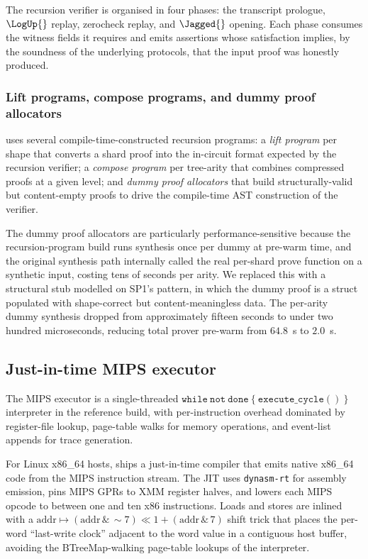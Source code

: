 The recursion verifier is organised in four phases: the transcript prologue, $\LogUp{}$ replay, zerocheck replay, and $\Jagged{}$ opening. Each phase consumes the witness fields it requires and emits assertions whose satisfaction implies, by the soundness of the underlying protocols, that the input proof was honestly produced.

\subsubsection{Lift programs, compose programs, and dummy proof allocators}

\Zirenver{} uses several compile-time-constructed recursion programs: a \emph{lift program} per shape that converts a shard proof into the in-circuit format expected by the recursion verifier; a \emph{compose program} per tree-arity that combines compressed proofs at a given level; and \emph{dummy proof allocators} that build structurally-valid but content-empty proofs to drive the compile-time AST construction of the verifier.

The dummy proof allocators are particularly performance-sensitive because the recursion-program build runs synthesis once per dummy at pre-warm time, and the original synthesis path internally called the real per-shard prove function on a synthetic input, costing tens of seconds per arity. We replaced this with a structural stub modelled on SP1's pattern, in which the dummy proof is a struct populated with shape-correct but content-meaningless data. The per-arity dummy synthesis dropped from approximately fifteen seconds to under two hundred microseconds, reducing total prover pre-warm from $64.8$~s to $2.0$~s.

\subsection{Just-in-time MIPS executor}
\label{sec:jit}

The MIPS executor is a single-threaded $\mathtt{while\ not\ done\ \{\ execute\_cycle()\ \}}$ interpreter in the reference build, with per-instruction overhead dominated by register-file lookup, page-table walks for memory operations, and event-list appends for trace generation.

For Linux x86\_64 hosts, \Zirenver{} ships a just-in-time compiler that emits native x86\_64 code from the MIPS instruction stream. The JIT uses \texttt{dynasm-rt} for assembly emission, pins MIPS GPRs to XMM register halves, and lowers each MIPS opcode to between one and ten x86 instructions. Loads and stores are inlined with a $\mathrm{addr} \mapsto (\mathrm{addr}\, \&\, \sim 7)\!\ll\!1 + (\mathrm{addr}\, \&\, 7)$ shift trick that places the per-word ``last-write clock'' adjacent to the word value in a contiguous host buffer, avoiding the BTreeMap-walking page-table lookups of the interpreter.

